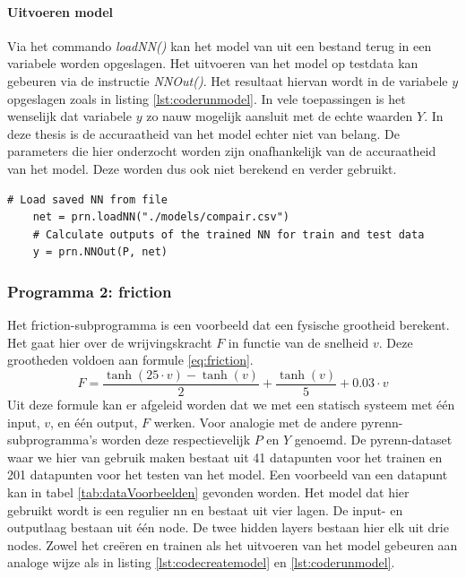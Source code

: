 			\newpage
			
			\paragraph{Uitvoeren model} 
			Via het commando \textit{loadNN()} kan het model van uit een bestand terug in een variabele worden opgeslagen. Het uitvoeren van het model op testdata kan gebeuren via de instructie \textit{NNOut()}. Het resultaat hiervan wordt in de variabele $y$ opgeslagen zoals in listing \ref{lst:coderunmodel}. In vele toepassingen is het wenselijk dat variabele $y$ zo nauw mogelijk aansluit met de echte waarden $Y$. In deze thesis is de accuraatheid van het model echter niet van belang. De parameters die hier onderzocht worden zijn onafhankelijk van de accuraatheid van het model. Deze worden dus ook niet berekend en verder gebruikt. 
	\begin{lstlisting}[caption={uitvoeren van pyrenn-model.},captionpos=b, label = {lst:coderunmodel}]
	# Load saved NN from file
	net = prn.loadNN("./models/compair.csv")
	# Calculate outputs of the trained NN for train and test data	
	y = prn.NNOut(P, net)
	\end{lstlisting}
		
		\subsubsection{Programma 2: friction}
		Het friction-subprogramma is een voorbeeld dat een fysische grootheid berekent. Het gaat hier over de wrijvingskracht $F$ in functie van de snelheid $v$. Deze grootheden voldoen aan formule \ref{eq:friction}. 
		\begin{equation}\label{eq:friction}
					F = \frac{\tanh(25 \cdot v)- \tanh(v)}{2} + \frac{\tanh(v)}{5}+0.03\cdot v			
		\end{equation}
		Uit deze formule kan er afgeleid worden dat we met een statisch systeem met \'e\'en input, $v$, en \'e\'en output, $F$ werken. Voor analogie met de andere pyrenn-subprogramma's worden deze respectievelijk $P$ en $Y$ genoemd. De pyrenn-dataset waar we hier van gebruik maken bestaat uit 41 datapunten voor het trainen en 201 datapunten voor het testen van het model. Een voorbeeld van een datapunt kan in tabel \ref{tab:dataVoorbeelden} gevonden worden. Het model dat hier gebruikt wordt is een regulier \gls{nn} en bestaat uit vier lagen. De input- en outputlaag bestaan uit \'e\'en node. De twee hidden layers bestaan hier elk uit drie nodes. Zowel het cre\"eren en trainen als het uitvoeren van het model gebeuren aan analoge wijze als in listing \ref{lst:codecreatemodel} en \ref{lst:coderunmodel}.
						
